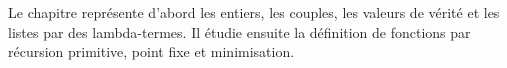 \documentclass[../../../include/open-logic-chapter]{subfiles}
\begin{document}

Le chapitre représente d'abord les entiers, les couples,
les valeurs de vérité et les listes par des lambda-termes.
Il étudie ensuite la définition de fonctions par récursion
primitive, point fixe et minimisation.


\OLEndChapterHook
\end{document}
